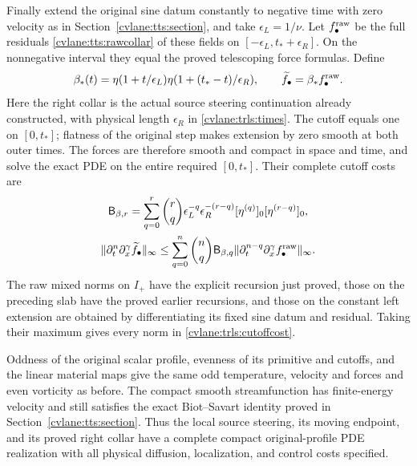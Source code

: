 Finally extend the original sine datum constantly to negative time
with zero velocity as in Section~\ref{cvlane:tts:section}, and take
$\epsilon_L=1/\nu$. Let $f_\bullet^{\rm raw}$ be the full
residuals \eqref{cvlane:tts:rawcollar} of these fields on
$[-\epsilon_L,t_*+\epsilon_R]$. On the nonnegative interval
they equal the proved telescoping force formulas. Define
\begin{equation}\label{cvlane:trls:timecutoff}
 \beta_*(t)=\eta(1+t/\epsilon_L)
             \eta(1+(t_*-t)/\epsilon_R),\qquad
 \widetilde f_\bullet=\beta_*f_\bullet^{\rm raw}.
\end{equation}
Here the right collar is the actual source steering continuation
already constructed, with physical length $\epsilon_R$ in
\eqref{cvlane:trls:times}. The cutoff equals one on $[0,t_*]$;
flatness of the original step makes extension by zero smooth at
both outer times. The forces are therefore smooth and compact in
space and time, and solve the exact PDE on the entire required
$[0,t_*]$. Their complete cutoff costs are
\begin{equation}\label{cvlane:trls:cutoffcost}
 \begin{gathered}
 \mathsf B_{\beta,r}=\sum_{q=0}^r\binom rq
      \epsilon_L^{-q}\epsilon_R^{-(r-q)}
       [\eta^{(q)}]_0[\eta^{(r-q)}]_0,\\
 \|\partial_t^n\partial_x^\gamma\widetilde f_\bullet\|_\infty
 \leq\sum_{q=0}^n\binom nq\mathsf B_{\beta,q}
  \|\partial_t^{n-q}\partial_x^\gamma
                                f_\bullet^{\rm raw}\|_\infty.
 \end{gathered}
\end{equation}
The raw mixed norms on $I_+$ have the explicit recursion just
proved, those on the preceding slab have the proved earlier
recursions, and those on the constant left extension are obtained
by differentiating its fixed sine datum and residual. Taking their
maximum gives every norm in \eqref{cvlane:trls:cutoffcost}.

Oddness of the original scalar profile, evenness of its primitive
and cutoffs, and the linear material maps give the same odd
temperature, velocity and forces and even vorticity as before.
The compact smooth streamfunction has finite-energy velocity and
still satisfies the exact Biot--Savart identity proved in
Section~\ref{cvlane:tts:section}. Thus the local source steering, its
moving endpoint, and its proved right collar have a complete
compact original-profile PDE realization with all physical
diffusion, localization, and control costs specified.


